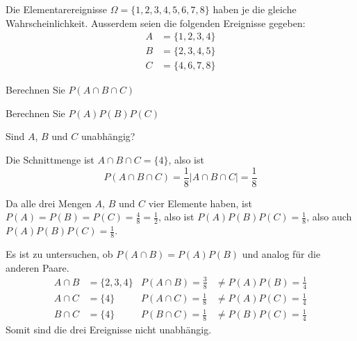 Die Elementarereignisse $\Omega=\{1,2,3,4,5,6,7,8\}$ haben je die gleiche
Wahrscheinlichkeit. Ausserdem seien die folgenden Ereignisse gegeben:
\begin{align*}
A&=\{1,2,3,4\}\\
B&=\{2,3,4,5\}\\
C&=\{4,6,7,8\}
\end{align*}
\begin{teilaufgaben}
\item Berechnen Sie $P(A\cap B\cap C)$
\item Berechnen Sie $P(A)P(B)P(C)$
\item Sind $A$, $B$ und $C$ unabhängig?
\end{teilaufgaben}

\begin{loesung}
\begin{teilaufgaben}
\item Die Schnittmenge ist $A\cap B\cap C=\{4\}$, also ist
\[
P(A\cap B\cap C)=\frac18|A\cap B\cap C|=\frac18
\]
\item Da alle drei Mengen $A$, $B$ und $C$ vier Elemente haben,
ist $P(A)=P(B)=P(C)=\frac{4}{8}=\frac12$, also ist
$P(A)P(B)P(C)=\frac18$, also auch $P(A)P(B)P(C)=\frac18$.
\item Es ist zu untersuchen, ob $P(A\cap B)=P(A)P(B)$ und analog für
die anderen Paare.
\begin{align*}
A\cap B&=\{2,3,4\}&P(A\cap B)=\frac38&\ne P(A)P(B)=\frac14\\
A\cap C&=\{4\}&P(A\cap C)=\frac18&\ne P(A)P(C)=\frac14\\
B\cap C&=\{4\}&P(B\cap C)=\frac18&\ne P(B)P(C)=\frac14
\end{align*}
Somit sind die drei Ereignisse nicht unabhängig.
\qedhere
\end{teilaufgaben}
\end{loesung}

